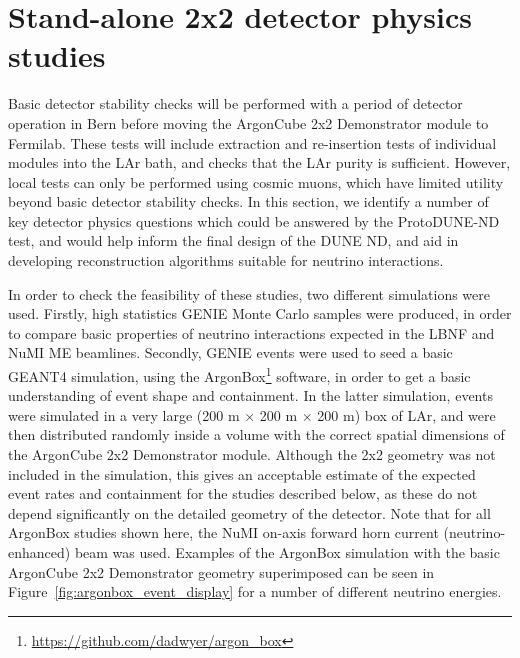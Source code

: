 \section{Stand-alone 2x2 detector physics studies}
\label{sec:detector-physics-studies}
Basic detector stability checks will be performed with a period of detector operation in Bern before moving the ArgonCube 2x2 Demonstrator module to Fermilab. These tests will include extraction and re-insertion tests of individual modules into the LAr bath, and checks that the LAr purity is sufficient. However, local tests can only be performed using cosmic muons, which have limited utility beyond basic detector stability checks. In this section, we identify a number of key detector physics questions which could be answered by the ProtoDUNE-ND test, and would help inform the final design of the DUNE ND, and aid in developing reconstruction algorithms suitable for neutrino interactions.

In order to check the feasibility of these studies, two different simulations were used. Firstly, high statistics GENIE Monte Carlo samples were produced, in order to compare basic properties of neutrino interactions expected in the LBNF and NuMI ME beamlines. Secondly, GENIE events were used to seed a basic GEANT4 simulation, using the ArgonBox\footnote{\url{https://github.com/dadwyer/argon_box}} software, in order to get a basic understanding of event shape and containment. In the latter simulation, events were simulated in a very large (200 m $\times$ 200 m $\times$ 200 m) box of LAr, and were then distributed randomly inside a volume with the correct spatial dimensions of the ArgonCube 2x2 Demonstrator module. Although the 2x2 geometry was not included in the simulation, this gives an acceptable estimate of the expected event rates and containment for the studies described below, as these do not depend significantly on the detailed geometry of the detector. Note that for all ArgonBox studies shown here, the NuMI on-axis forward horn current (neutrino-enhanced) beam was used. Examples of the ArgonBox simulation with the basic ArgonCube 2x2 Demonstrator geometry superimposed can be seen in Figure~\ref{fig:argonbox_event_display} for a number of different neutrino energies.

